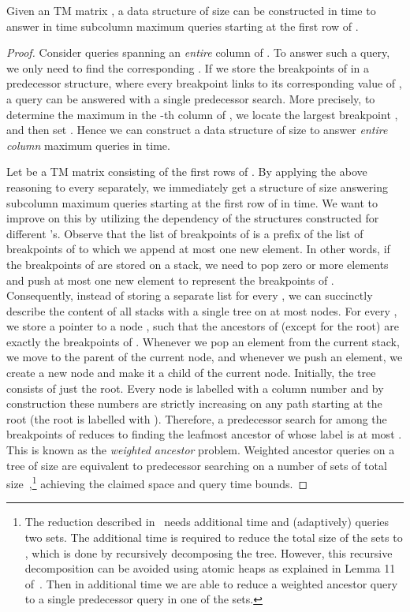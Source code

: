 \documentclass{llncs}
\begin{document}
\begin{lemma}
\label{lem:subcolumn}
Given an  TM matrix , a data structure of size  can be constructed
in  time to answer in  time subcolumn maximum queries starting at the first row of .
\end{lemma}

\begin{proof}
Consider queries spanning an {\em entire} column  of . To answer such a query, we only need to find
the corresponding . If we store the breakpoints of  in a predecessor structure, where
every breakpoint  links to its corresponding value of , a query can be answered
with a single predecessor search. More precisely, to determine the maximum in the -th
column of , we locate the largest breakpoint , and then set .
Hence we can construct a data structure of size  to answer {\em entire column} maximum
queries in  time.

Let  be a TM matrix consisting of the first  rows of . By applying the above
reasoning to every  separately, we immediately get a structure of size  answering
subcolumn maximum queries starting at the first row of  in  time. We
want to improve on this by utilizing the dependency of the structures constructed for different 's. Observe that the list of breakpoints of  is a prefix
of the list of breakpoints of  to which we append at most one new element. In other words,
if the breakpoints of  are stored on a stack, we need to pop zero or more elements and push
at most one new element to represent the breakpoints of . Consequently, instead of storing a separate list for every ,
we can succinctly describe the content of all stacks with a single tree  on at most 
nodes. For every , we store a pointer to a node , such that the ancestors of 
(except for the root) are exactly the breakpoints of .
Whenever we pop an element from the current stack, we move to the parent of the current
node, and whenever we push an element, we create a new node and make it a child of the
current node. Initially, the tree consists of just the root. Every node is labelled with a column
number and by construction these numbers are strictly increasing on any path starting at
the root (the root is labelled with ). 
Therefore, a predecessor search for  among the 
breakpoints of  reduces to finding the leafmost ancestor of  whose label is at most . 
This is known as the {\em weighted ancestor} problem.
Weighted ancestor queries on a tree of size 
are equivalent to predecessor searching on a number of sets of 
total size~\cite{Kopelowitz},\footnote{The reduction described in~\cite{Kopelowitz}
needs  additional time and (adaptively) queries two sets. The additional
time is required to reduce the total size of the sets to , which is done
by recursively decomposing the tree. However, this recursive decomposition
can be avoided using atomic heaps as explained in Lemma 11 of~\cite{GawrychowskiLN14}.
Then in  additional time we are able to reduce a weighted ancestor query
to a single predecessor query in one of the sets.}
achieving the claimed space and query time bounds.


\end{proof}
\end{document}
